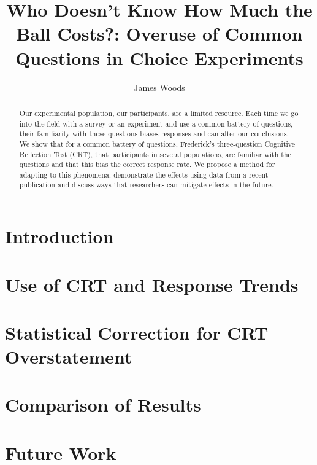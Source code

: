 \documentclass{article}
\author{James Woods}
\title{Who Doesn't Know How Much the Ball Costs?:  Overuse of Common Questions in Choice Experiments}
\begin{document}
\maketitle


\begin{abstract}

Our experimental population, our participants, are a limited resource.  Each time we go into the field with a survey or an experiment and use a common battery of questions, their familiarity with those questions biases responses and can alter our conclusions.  We show that for a common battery of questions, Frederick's three-question Cognitive Reflection Test (CRT),  that participants in several populations, are familiar with the questions and that this bias the correct response rate.  We propose a method for adapting to this phenomena, demonstrate the effects using data from a recent publication and discuss ways that researchers can mitigate effects in the future.

\end{abstract}


\section{Introduction}

\section{Use of CRT and Response Trends}

\section{Statistical Correction for CRT Overstatement}

\section{Comparison of Results}

\section{Future Work}
\end{document}
